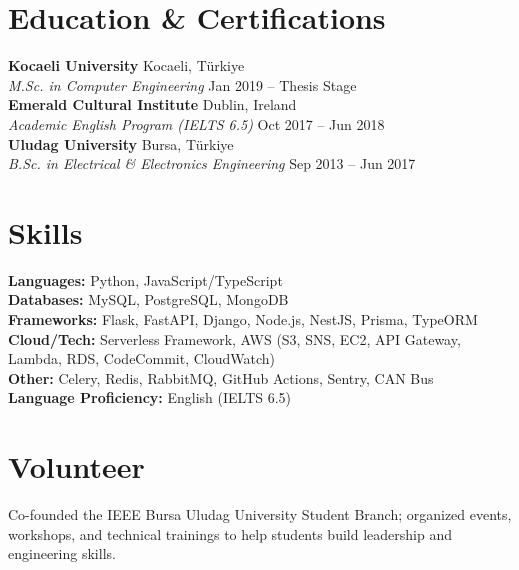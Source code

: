 \documentclass[10pt,a4paper]{extarticle}
\begin{document}
\section{Education \& Certifications}
\textbf{Kocaeli University} \hfill Kocaeli, Türkiye\\
\textit{M.Sc. in Computer Engineering} \hfill Jan 2019 -- Thesis Stage\\[4pt]
\textbf{Emerald Cultural Institute} \hfill Dublin, Ireland\\
\textit{Academic English Program (IELTS 6.5)} \hfill Oct 2017 -- Jun 2018\\[4pt]
\textbf{Uludag University} \hfill Bursa, Türkiye\\
\textit{B.Sc. in Electrical \& Electronics Engineering} \hfill Sep 2013 -- Jun 2017\\[6pt]


\section{Skills}
\textbf{Languages:} Python, JavaScript/TypeScript\\
\textbf{Databases:} MySQL, PostgreSQL, MongoDB\\
\textbf{Frameworks:} Flask, FastAPI, Django, Node.js, NestJS, Prisma, TypeORM\\
\textbf{Cloud/Tech:} Serverless Framework, AWS (S3, SNS, EC2, API Gateway, Lambda, RDS, CodeCommit, CloudWatch)\\
\textbf{Other:} Celery, Redis, RabbitMQ, GitHub Actions, Sentry, CAN Bus\\
\textbf{Language Proficiency:} English (IELTS 6.5)

\section{Volunteer}
Co-founded the IEEE Bursa Uludag University Student Branch; organized events, workshops, and technical trainings to help students build leadership and engineering skills.
\end{document}
